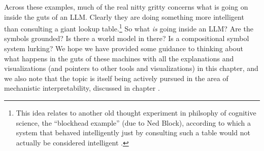 Across these examples, much of the real nitty gritty concerns what is going on inside the guts of an LLM. Clearly they are doing something more intelligent than consulting a giant lookup table.\footnote{This idea relates to another old thought experiment in philsophy of cognitive science, the ``blockhead example'' (due to Ned Block), according to which a system that behaved intelligently just by consulting such a table would not actually be considered intelligent \cite{milliere2024philosophical1}.} So what \emph{is} going inside an LLM? Are the symbols grounded? Is there a world model in there? Is a compositional symbol system lurking?  We hope we have provided some guidance to thinking about what happens in the guts of these machines with all the explanations and visualizations (and pointers to other tools and visualizations) in this chapter, and we also note that the topic is itself being actively pursued in the area of mechanistic interpretability, discussed in chapter . 

